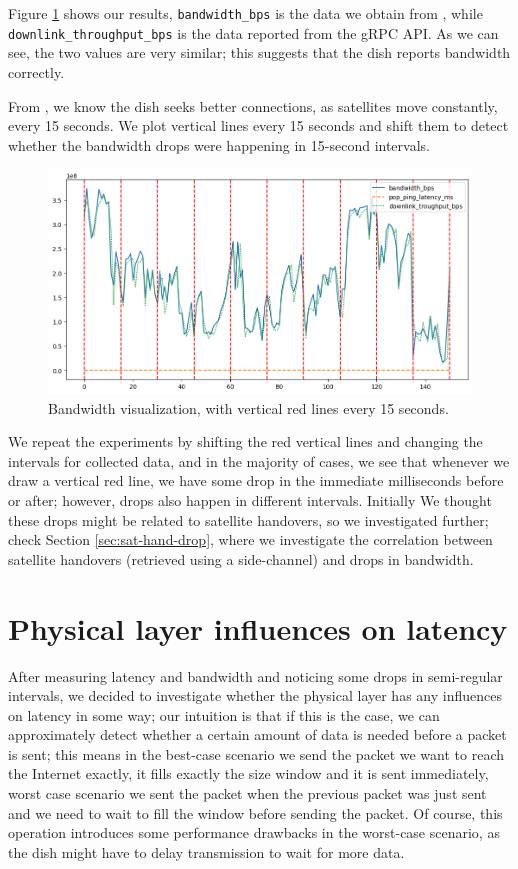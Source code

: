 \documentclass[IN,11pt,twoside,openright,idp,english]{tumthesis}
\begin{document}
Figure \ref{fig:vis-bw-15sec} shows our results, \texttt{bandwidth\_bps} is the data we obtain from
, while \texttt{downlink\_throughput\_bps} is the data reported
from the gRPC API. As we can see, the two values are very similar; this suggests that the dish reports bandwidth
correctly.

From \cite{llc-application}, we know the dish seeks better connections, as satellites move constantly, every 15 seconds.
We plot vertical lines every 15 seconds and shift them to detect whether the bandwidth drops were happening in 15-second
intervals.

\begin{figure}
    \centering
    \includegraphics[width=1.0\columnwidth]{img/bw-15seconds.png}
    \caption{Bandwidth visualization, with vertical red lines every 15 seconds.}
    \label{fig:vis-bw-15sec}
\end{figure}

We repeat the experiments by shifting the red vertical lines and changing the intervals for collected data, and in the
majority of cases, we see that whenever we draw a vertical red line, we have some drop in the immediate milliseconds
before or after; however, drops also happen in different intervals. Initially We thought these drops might be related to
satellite handovers, so we investigated further; check Section \ref{sec:sat-hand-drop}, where we investigate the
correlation between satellite handovers (retrieved using a side-channel) and drops in bandwidth. 

\section{Physical layer influences on latency}

After measuring latency and bandwidth and noticing some drops in semi-regular intervals, we decided to investigate
whether the physical layer has any influences on latency in some way; our intuition is that if this is the case, we can
approximately detect whether a certain amount of data is needed before a packet is sent; this means in the best-case
scenario we send the packet we want to reach the Internet exactly, it fills exactly the size window and it is sent
immediately, worst case scenario we sent the packet when the previous packet was just sent and we need to wait to fill
the window before sending the packet. Of course, this operation introduces some performance drawbacks in the worst-case
scenario, as the dish might have to delay transmission to wait for more data.
\end{document}
